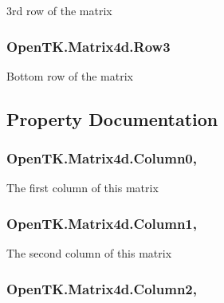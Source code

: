 3rd row of the matrix 

\hypertarget{struct_open_t_k_1_1_matrix4d_aea87805ef21d4b14fd0a2fb32cb4475a}{
\subsubsection[{Row3}]{ Open\-T\-K.\-Matrix4d.\-Row3}}\label{struct_open_t_k_1_1_matrix4d_aea87805ef21d4b14fd0a2fb32cb4475a}


Bottom row of the matrix 



\subsection{Property Documentation}
\hypertarget{struct_open_t_k_1_1_matrix4d_a3835b3cd858e49706ba401be94fdf43a}{
\subsubsection[{Column0}]{ Open\-T\-K.\-Matrix4d.\-Column0\hspace{0.3cm}{\ttfamily [get]}, {\ttfamily [set]}}}\label{struct_open_t_k_1_1_matrix4d_a3835b3cd858e49706ba401be94fdf43a}


The first column of this matrix 

\hypertarget{struct_open_t_k_1_1_matrix4d_a81716156eeb21eff89a4bcb31025e521}{
\subsubsection[{Column1}]{ Open\-T\-K.\-Matrix4d.\-Column1\hspace{0.3cm}{\ttfamily [get]}, {\ttfamily [set]}}}\label{struct_open_t_k_1_1_matrix4d_a81716156eeb21eff89a4bcb31025e521}


The second column of this matrix 

\hypertarget{struct_open_t_k_1_1_matrix4d_aa6ee0a1972252133098f8e333d9afe69}{
\subsubsection[{Column2}]{ Open\-T\-K.\-Matrix4d.\-Column2\hspace{0.3cm}{\ttfamily [get]}, {\ttfamily [set]}}}\label{struct_open_t_k_1_1_matrix4d_aa6ee0a1972252133098f8e333d9afe69}


